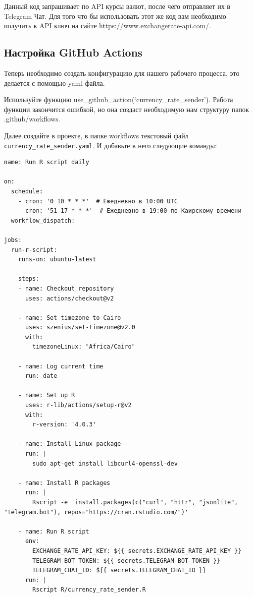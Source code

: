 \documentclass[
]{book}
\begin{document}
Данный код запрашивает по API курсы валют, после чего отправляет их в Telegram Чат. Для того что бы использовать этот же код вам необходимо получить к API ключ на сайте \url{https://www.exchangerate-api.com/}.

\subsection{Настройка GitHub Actions}\label{ux43dux430ux441ux442ux440ux43eux439ux43aux430-github-actions}

Теперь необходимо создать конфигурацию для нашего рабочего процесса, это делается с помощью yaml файла.

Используйте функцию use\_github\_action(`currency\_rate\_sender'). Работа функции закончится ошибкой, но она создаст необходимую нам структуру папок .github/workflows.

Далее создайте в проекте, в папке workflows текстовый файл \texttt{currency\_rate\_sender.yaml}. И добавьте в него следующие команды:

\begin{verbatim}
name: Run R script daily

on:
  schedule:
    - cron: '0 10 * * *'  # Ежедневно в 10:00 UTC
    - cron: '51 17 * * *'  # Ежедневно в 19:00 по Каирскому времени
  workflow_dispatch:

jobs:
  run-r-script:
    runs-on: ubuntu-latest

    steps:
    - name: Checkout repository
      uses: actions/checkout@v2
      
    - name: Set timezone to Cairo
      uses: szenius/set-timezone@v2.0
      with:
        timezoneLinux: "Africa/Cairo"
        
    - name: Log current time
      run: date

    - name: Set up R
      uses: r-lib/actions/setup-r@v2
      with:
        r-version: '4.0.3'
        
    - name: Install Linux package
      run: |
        sudo apt-get install libcurl4-openssl-dev

    - name: Install R packages
      run: |
        Rscript -e 'install.packages(c("curl", "httr", "jsonlite", "telegram.bot"), repos="https://cran.rstudio.com/")'

    - name: Run R script
      env:
        EXCHANGE_RATE_API_KEY: ${{ secrets.EXCHANGE_RATE_API_KEY }}
        TELEGRAM_BOT_TOKEN: ${{ secrets.TELEGRAM_BOT_TOKEN }}
        TELEGRAM_CHAT_ID: ${{ secrets.TELEGRAM_CHAT_ID }}
      run: |
        Rscript R/currency_rate_sender.R
\end{verbatim}
\end{document}
